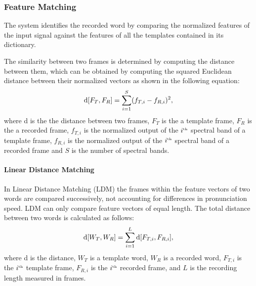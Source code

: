 \subsubsection{Feature Matching}
The system identifies the recorded word by comparing the normalized features of the input signal against the features of all the templates contained in its dictionary.

The similarity between two frames is determined by computing the distance between them, which can be obtained by computing the squared Euclidean distance between their normalized vectors as shown in the following equation:
\begin{equation}
    {\rm d}[F_T, F_R] = \sum\limits^S_{i=1} (f_{T,i} - f_{R,i})^2,
    \label{eq:frame_dist}
\end{equation}
where d is the the distance between two frames, $F_T$ is the a template frame, $F_R$ is the a recorded frame, $f_{T,i}$ is the normalized output of the $i^{\text{\tiny th}}$ spectral band of a template frame, $f_{R,i}$ is the normalized output of the $i^{\text{\tiny th}}$ spectral band of a recorded frame and $S$ is the number of spectral bands.


\paragraph{Linear Distance Matching}
\label{sec:LDM}
In Linear Distance Matching (LDM) the frames within the feature vectors of two words are compared successively, not accounting for differences in pronunciation speed. LDM can only compare feature vectors of equal length.
The total distance between two words is calculated as follows:
\begin{equation}
{\rm d}[W_T, W_R] = \sum\limits^{L}_{i=1} {\rm d}[F_{T,i}, F_{R,i}],
\end{equation}
where d is the distance, $W_T$ is a template word, $W_R$ is a recorded word,  $F_{T,i}$ is the $i^{\text{\tiny th}}$ template frame, $F_{R,i}$ is the $i^{\text{\tiny th}}$ recorded frame, and $L$ is the recording length measured in frames.





